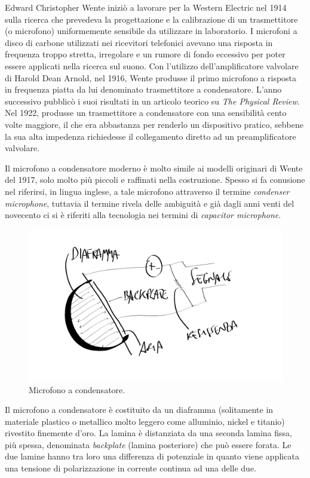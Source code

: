 \begin{refsection}
Edward Christopher Wente iniziò a lavorare per la Western Electric nel 1914
sulla ricerca che prevedeva la progettazione e la calibrazione di un
trasmettitore (o microfono) uniformemente sensibile da utilizzare in laboratorio.
I microfoni a disco di carbone utilizzati nei ricevitori telefonici avevano una
risposta in frequenza troppo stretta, irregolare e un rumore di fondo eccessivo
per poter essere applicati nella ricerca sul suono. Con l'utilizzo
dell'amplificatore valvolare di Harold Dean Arnold, nel 1916, Wente produsse il
primo microfono a risposta in frequenza piatta da lui denominato trasmettitore a
condensatore. L'anno successivo pubblicò i suoi risultati in
un articolo teorico su \emph{The Physical Review}. Nel 1922, produsse un
trasmettitore a condensatore con una sensibilità cento volte maggiore, il che
era abbastanza per renderlo un dispositivo pratico, sebbene la sua alta
impedenza richiedesse il collegamento diretto ad un preamplificatore valvolare.

Il microfono a condensatore moderno è molto simile ai modelli originari di Wente
del 1917, solo molto più piccoli e raffinati nella costruzione. Spesso si fa
conusione nel riferirsi, in lingua inglese, a tale microfono attraverso il termine
\emph{condenser microphone}, tuttavia il termine rivela delle ambiguità e già
dagli anni venti del novecento ci si è riferiti alla tecnologia nei termini
di \emph{capacitor microphone}.

\begin{figure}[h]
\centering
\includegraphics[width=0.99\columnwidth]{CAPITOLI/0200/img/mic-capacitor.png}
\caption[]{Microfono a condensatore.}
\label{mic:condensatore}
\end{figure}

Il microfono a condensatore è costituito da un diaframma (solitamente in materiale
plastico o metallico molto leggero come alluminio, nickel e titanio)
rivestito finemente d'oro. La lamina è distanziata da una seconda lamina fissa, più spessa,
denominata \emph{backplate} (lamina posteriore) che può essere forata. Le due
lamine hanno tra loro una differenza di potenziale in quanto
viene applicata una tensione di polarizzazione in corrente continua ad una delle
due.


\end{refsection}
